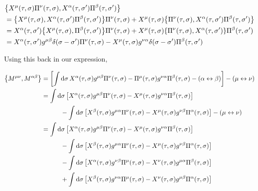 \begin{align*}
    &\acomm{X^\mu\qty(\tau,\sigma)\Pi^\nu\qty(\tau,\sigma)}{X^\alpha\qty(\tau,\sigma')\Pi^\beta\qty(\tau,\sigma')}\\
    &=\acomm{X^\mu\qty(\tau,\sigma)}{X^\alpha\qty(\tau,\sigma')\Pi^\beta\qty(\tau,\sigma')}\Pi^\nu\qty(\tau,\sigma)+X^\mu\qty(\tau,\sigma)\acomm{\Pi^\nu\qty(\tau,\sigma)}{X^\alpha\qty(\tau,\sigma')\Pi^\beta\qty(\tau,\sigma')}\\
    &=X^\alpha\qty(\tau,\sigma')\acomm{X^\mu\qty(\tau,\sigma)}{\Pi^\beta\qty(\tau,\sigma')}\Pi^\nu\qty(\tau,\sigma)+X^\mu\qty(\tau,\sigma)\acomm{\Pi^\nu\qty(\tau,\sigma)}{X^\alpha\qty(\tau,\sigma')}\Pi^\beta\qty(\tau,\sigma')\\
    &=X^\alpha\qty(\tau,\sigma')g^{\mu\beta}\delta\qty(\sigma-\sigma')\Pi^\nu\qty(\tau,\sigma)-X^\mu\qty(\tau,\sigma)g^{\nu\alpha}\delta\qty(\sigma-\sigma')\Pi^\beta\qty(\tau,\sigma')
\end{align*}

Using this back in our expression,

\begin{align*}
    \acomm{M^{\mu\nu}}{M^{\alpha\beta}}&=\qty[\int\dd{\sigma}X^\alpha\qty(\tau,\sigma)g^{\mu\beta}\Pi^\nu\qty(\tau,\sigma)-\Pi^\mu\qty(\tau,\sigma)g^{\nu\alpha}\Pi^\beta\qty(\tau,\sigma)-\qty(\alpha\leftrightarrow\beta)]-\qty(\mu\leftrightarrow\nu)\\
    &=\int\dd{\sigma}\qty[X^\alpha\qty(\tau,\sigma)g^{\mu\beta}\Pi^\nu\qty(\tau,\sigma)-X^\mu\qty(\tau,\sigma)g^{\nu\alpha}\Pi^\beta\qty(\tau,\sigma)]\\
    &\quad\quad\quad-\int\dd{\sigma}\qty[X^\beta\qty(\tau,\sigma)g^{\mu\alpha}\Pi^\nu\qty(\tau,\sigma)-X^\mu\qty(\tau,\sigma)g^{\nu\beta}\Pi^\alpha\qty(\tau,\sigma)]-\qty(\mu\leftrightarrow\nu)\\
    &=\int\dd{\sigma}\qty[X^\alpha\qty(\tau,\sigma)g^{\mu\beta}\Pi^\nu\qty(\tau,\sigma)-X^\mu\qty(\tau,\sigma)g^{\nu\alpha}\Pi^\beta\qty(\tau,\sigma)]\\
    &\quad\quad\quad-\int\dd{\sigma}\qty[X^\beta\qty(\tau,\sigma)g^{\mu\alpha}\Pi^\nu\qty(\tau,\sigma)-X^\mu\qty(\tau,\sigma)g^{\nu\beta}\Pi^\alpha\qty(\tau,\sigma)]\\
    &\quad\quad\quad-\int\dd{\sigma}\qty[X^\alpha\qty(\tau,\sigma)g^{\nu\beta}\Pi^\mu\qty(\tau,\sigma)-X^\nu\qty(\tau,\sigma)g^{\mu\alpha}\Pi^\beta\qty(\tau,\sigma)]\\
    &\quad\quad\quad+\int\dd{\sigma}\qty[X^\beta\qty(\tau,\sigma)g^{\nu\alpha}\Pi^\mu\qty(\tau,\sigma)-X^\nu\qty(\tau,\sigma)g^{\mu\beta}\Pi^\alpha\qty(\tau,\sigma)]
\end{align*}

